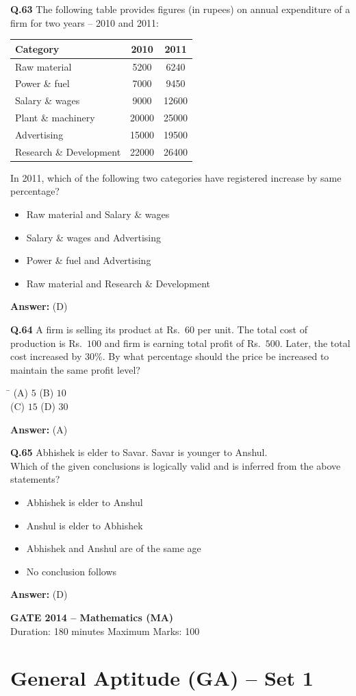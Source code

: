 \documentclass[11pt,a4paper]{article}
\newcommand{\optsfourA}[4]{%
  \begin{tabbing}
    \hspace{0.48\linewidth}\=\kill
    (A) #1 \> (B) #2 \\[2pt]
    (C) #3 \> (D) #4
  \end{tabbing}%
}
\newcommand{\optslistA}[4]{%
  \begin{itemize}
    \setlength{\itemsep}{2pt}\setlength{\parskip}{0pt}
    \item[(A)] #1
    \item[(B)] #2
    \item[(C)] #3
    \item[(D)] #4
  \end{itemize}%
}
\newcommand{\ans}[1]{\textbf{Answer:} #1\par\medskip}
\begin{document}
\textbf{Q.63} The following table provides figures (in rupees) on annual expenditure of a firm for two years -- 2010 and 2011:
\begin{center}
\begin{tabular}{lcc}
  \toprule
  Category & 2010 & 2011 \\
  \midrule
  Raw material & 5200 & 6240 \\
  Power \& fuel & 7000 & 9450 \\
  Salary \& wages & 9000 & 12600 \\
  Plant \& machinery & 20000 & 25000 \\
  Advertising & 15000 & 19500 \\
  Research \& Development & 22000 & 26400 \\
  \bottomrule
\end{tabular}
\end{center}
In 2011, which of the following two categories have registered increase by same percentage?
\optslistA{Raw material and Salary \& wages}{Salary \& wages and Advertising}{Power \& fuel and Advertising}{Raw material and Research \& Development}
\ans{(D)}

\textbf{Q.64} A firm is selling its product at Rs.\ $60$ per unit. The total cost of production is Rs.\ $100$ and firm is earning total profit of Rs.\ $500$. Later, the total cost increased by $30\%$. By what percentage should the price be increased to maintain the same profit level?
\optsfourA{$5$}{$10$}{$15$}{$30$}
\ans{(A)}

\textbf{Q.65} Abhishek is elder to Savar. Savar is younger to Anshul.\\
Which of the given conclusions is logically valid and is inferred from the above statements?
\optslistA{Abhishek is elder to Anshul}{Anshul is elder to Abhishek}{Abhishek and Anshul are of the same age}{No conclusion follows}
\ans{(D)}

\newpage


\begin{center}
  {\Large\bfseries GATE 2014 -- Mathematics (MA)}\\[4pt]
  {\small Duration: 180 minutes \quad\textbar\quad Maximum Marks: 100}
\end{center}

\section*{General Aptitude (GA) -- Set 1}
\end{document}
